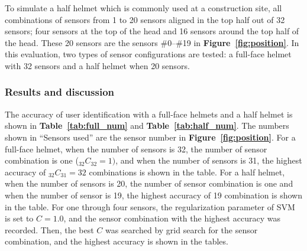 \documentclass[sigchi,authordraft]{acmart}
\newcommand\figref[1]{\textbf{Figure~\ref{fig:#1}}}
\newcommand\tabref[1]{\textbf{Table~\ref{tab:#1}}}
\begin{document}

To simulate a half helmet which is commonly used at a construction site, all combinations of sensors from 1 to 20 sensors aligned in the top half out of 32 sensors; four sensors at the top of the head and 16 sensors around the top half of the head. These 20 sensors are the sensors \#0--\#19 in \figref{position}. In this evaluation, two types of sensor configurations are tested: a full-face helmet with 32 sensors and a half helmet when 20 sensors.



\subsubsection{Results and discussion}
The accuracy of user identification with a full-face helmets and a half helmet is shown in \tabref{full_num} and \tabref{half_num}. The numbers shown in ``Sensors used'' are the sensor number in \figref{position}.
For a full-face helmet, when the number of sensors is 32, the number of sensor combination is one ($_{32}C_{32}=1)$, and when the number of sensors is 31, the highest accuracy of  $_{32}C_{31}=32$ combinations is shown in the table. For a half helmet, when the number of sensors is 20, the number of sensor combination is one and when the number of sensor is 19, the highest accuracy of 19 combination is shown in the table. For one through four sensors, the 
regularization parameter of SVM is set to $C=1.0$, and the sensor combination with the highest accuracy was recorded. Then, the best $C$ was searched by grid search for the sensor combination, and the highest accuracy is shown in the tables.

\end{document}
